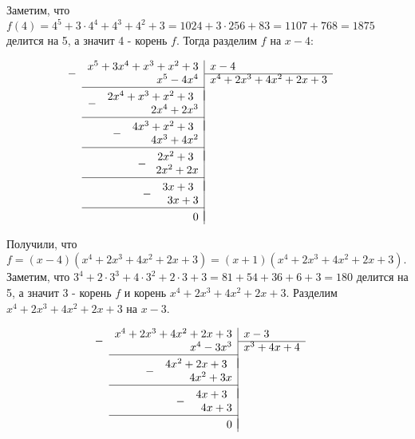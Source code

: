 \documentclass[a4paper, 16pt]{article}
\newcommand{\dropsign}[1]{\smash{\llap{\raisebox{-.5\normalbaselineskip}{$#1$\hspace{2\arraycolsep}}}}}%
\newenvironment{solution}[1][Решение]{%
	\begin{trivlist}
		\item[\hskip \labelsep {\bfseries #1:}]
		\item \hspace{15pt}
	}{
	\end{trivlist}
}
\begin{document}
					\begin{solution}
			
				Заметим, что $f(4) = 4^5 + 3 \cdot 4^4 + 4^3 + 4^2 + 3 = 1024 + 3 \cdot 256 + 83 = 1107 + 768 = 1875$ делится на 5, а значит 4 - корень $f$. Тогда разделим $f$ на $x - 4$: 
				
				\begin{gather*}
					\begin{array}{r|l}
						\dropsign{-} x^5+ 3x^4+ x^3 + x^2 + 3 & x -4	\\ \cline{2-2}
						x^5 - 4x^4&
						x^4 + 2x^3 + 4x^2 + 2x + 3
						\\ \cline{1-1} \\[\dimexpr-\normalbaselineskip+\jot]
						\dropsign{-} 
						2x^4+ x^3 + x^2 + 3\:\: \\
						2x^4 + 2x^3
						\\ \cline{1-1} \\[\dimexpr-\normalbaselineskip+\jot]
						\dropsign{-} 
						4x^3 + x^2 + 3\:\: \\
						4x^3 + 4x^2
						\\ \cline{1-1} 	\\[\dimexpr-\normalbaselineskip+\jot]		
						\dropsign{-} 
						2x^2 + 3		 \:\: \\
						2x^2 + 2x
						\\ \cline{1-1} 	\\[\dimexpr-\normalbaselineskip+\jot]		
						\dropsign{-} 
						3x + 3			 \:\: \\
						3x + 3
												\\ \cline{1-1} 	\\[\dimexpr-\normalbaselineskip+\jot]		
												0
					\end{array}
				\end{gather*}
			
			Получили, что $f = (x-4)(x^4 + 2x^3 + 4x^2 + 2x + 3) = (x+1)(x^4 + 2x^3 + 4x^2 + 2x + 3)$. Заметим, что $3^4 + 2 \cdot 3^3 + 4 \cdot 3^2 + 2 \cdot 3 + 3 = 81 + 54 + 36 + 6 + 3 = 180$ делится на 5, а значит 3 - корень $f$ и корень $x^4 + 2x^3 + 4x^2 + 2x + 3$. Разделим $x^4 + 2x^3 + 4x^2 + 2x + 3$ на $x - 3$.
			
			\begin{gather*}
				\begin{array}{r|l}
					\dropsign{-} x^4 + 2x^3 + 4x^2 + 2x + 3 & x - 3	\\ \cline{2-2}
					x^4-3x^3 & 
					x^3 + 4x + 4
					\\ \cline{1-1} \\[\dimexpr-\normalbaselineskip+\jot]
					\dropsign{-} 
					4x^2 + 2x + 3\:\: \\
					4x^2 + 3x
					\\ \cline{1-1} \\[\dimexpr-\normalbaselineskip+\jot]
					\dropsign{-} 
					4x + 3 \:\: \\
					4x + 3
					\\ \cline{1-1} 	\\[\dimexpr-\normalbaselineskip+\jot]		
					0
				\end{array}
			\end{gather*}
		

\end{solution}
\end{document}
